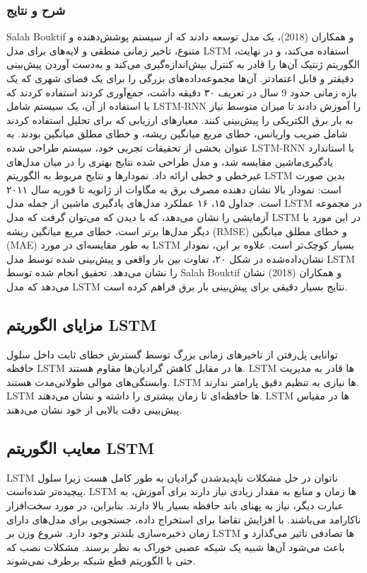 \documentclass{CSICC2020}
\begin{document}
\subsubsection{شرح و نتایج }
Salah Bouktif و همکاران (2018)، یک مدل توسعه دادند که از سیستم پوشش‌دهنده و متنوع، تاخیر زمانی منطقی و لایه‌های برای مدل LSTM استفاده می‌کند، و در نهایت، الگوریتم ژنتیک آن‌ها را قادر به کنترل بیش‌اندازه‌گیری می‌کند و به‌دست آوردن پیش‌بینی دقیقتر و قابل اعتماد‌تر. آن‌ها مجموعه‌داده‌های بزرگی را برای یک فضای شهری که یک بازه زمانی حدود 9 سال در تعریف ۳۰ دقیقه داشت، جمع‌آوری کردند استفاده کردند که با استفاده از آن، یک سیستم شامل LSTM-RNN را آموزش دادند تا میزان متوسط نیاز به بار برق الکتریکی را پیش‌بینی کنند. معیارهای ارزیابی که برای تحلیل استفاده کردند شامل ضریب واریانس، خطای مربع میانگین ریشه، و خطای مطلق میانگین بودند. به عنوان بخشی از تحقیقات تجربی خود، سیستم طراحی شده LSTM-RNN با استاندارد یادگیری‌ماشین مقایسه شد، و مدل طراحی شده نتایج بهتری را در میان مدل‌های غیرخطی و خطی ارائه داد. نمودارها و نتایج مربوط به الگوریتم LSTM بدین صورت است: 
نمودار بالا نشان دهنده مصرف برق به مگاوات از ژانویه تا فوریه سال ۲۰۱۱ است. 
جداول ۱۵، ۱۶ عملکرد مدل‌های یادگیری ماشین از جمله مدل LSTM در مجموعه آزمایشی را نشان می‌دهد، که با دیدن که می‌توان گرفت که مدل LSTM در این مورد با دیگر مدل‌ها برتر است، خطای مربع میانگین ریشه (RMSE) و خطای مطلق میانگین (MAE) به طور مقایسه‌ای در مورد LSTM بسیار کوچک‌تر است. علاوه بر این، نمودار نشان‌داده‌شده در شکل ۲۰، تفاوت بین بار واقعی و پیش‌بینی شده توسط مدل LSTM را نشان می‌دهد. تحقیق انجام شده توسط Salah Bouktif و همکاران (2018) نشان می‌دهد که مدل LSTM نتایج بسیار دقیقی برای پیش‌بینی بار برق فراهم کرده است. 

\subsection{مزایای الگوریتم LSTM}
توانایی پل‌رفتن از تاخیرهای زمانی بزرگ توسط گسترش خطای ثابت داخل سلول حافظه 
 LSTM ها در مقابل کاهش گرادیان‌ها مقاوم هستند. 
LSTM ها قادر به مدیریت وابستگی‌های موالی طولانی‌مدت هستند. 
LSTM ها نیازی به تنظیم دقیق پارامتر ندارند. 
LSTM ها حافظه‌ای تا زمان بیشتری را داشته و نشان می‌دهند. 
LSTM ها در مقیاس پیش‌بینی دقت بالایی از خود نشان می‌دهند. 
\subsection{معایب الگوریتم LSTM}
  LSTM ناتوان در حل مشکلات ناپدیدشدن گرادیان به طور کامل هست زیرا سلول پیچیده‌تر شده‌است. 
 LSTM ها زمان و منابع به مقدار زیادی نیاز دارند برای آموزش، به عبارت دیگر، نیاز به پهنای باند حافظه بسیار بالا دارند. بنابراین، در مورد سخت‌افزار ناکارامد می‌باشند. 
با افزایش تقاضا برای استخراج داده، جستجویی برای مدل‌های دارای زمان ذخیره‌سازی بلندتر وجود دارد. 
 شروع وزن بر LSTM ها تصادفی تاثیر می‌گذارد  و باعث می‌شود آن‌ها شبیه یک شبکه عصبی خوراک به نظر برسند. 
 مشکلات نصب که حتی با الگوریتم قطع شبکه برطرف نمی‌شوند. 
\end{document}
